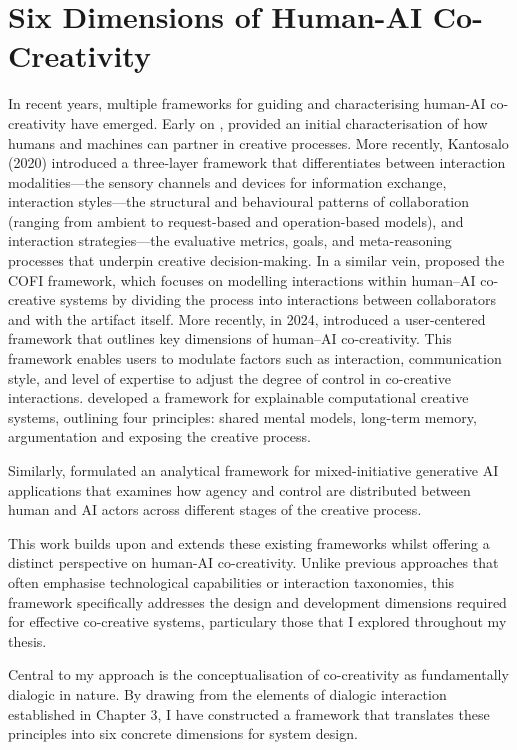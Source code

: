 \section{Six Dimensions of Human-AI Co-Creativity}

In recent years, multiple frameworks for guiding and characterising human-AI co-creativity have emerged. Early on \cite{Lubart2005-zi}, provided an initial characterisation of how humans and machines can partner in creative processes. More recently, Kantosalo (2020) introduced a three-layer framework that differentiates between interaction modalities—the sensory channels and devices for information exchange, interaction styles—the structural and behavioural patterns of collaboration (ranging from ambient to request-based and operation-based models), and interaction strategies—the evaluative metrics, goals, and meta-reasoning processes that underpin creative decision-making. In a similar vein, \cite{Rezwana2022-gg} proposed the COFI framework, which focuses on modelling interactions within human–AI co-creative systems by dividing the process into interactions between collaborators and with the artifact itself. More recently, in 2024, \cite{Moruzzi2024-cq} introduced a user-centered framework that outlines key dimensions of human–AI co-creativity. This framework enables users to modulate factors such as interaction, communication style, and level of expertise to adjust the degree of control in co-creative interactions. \cite{Llano2022-ti} developed a framework for explainable computational creative systems, outlining four principles: shared mental models, long-term memory, argumentation and exposing the creative process.

Similarly, \cite{Muller2020-nv} formulated an analytical framework for mixed-initiative generative AI applications that examines how agency and control are distributed between human and AI actors across different stages of the creative process.

This work builds upon and extends these existing frameworks whilst offering a distinct perspective on human-AI co-creativity. Unlike previous approaches that often emphasise technological capabilities or interaction taxonomies, this framework specifically addresses the design and development dimensions required for effective co-creative systems, particulary those that I explored throughout my thesis.

Central to my approach is the conceptualisation of co-creativity as fundamentally dialogic in nature. By drawing from the elements of dialogic interaction established in Chapter 3, I have constructed a framework that translates these principles into six concrete dimensions for system design. 

